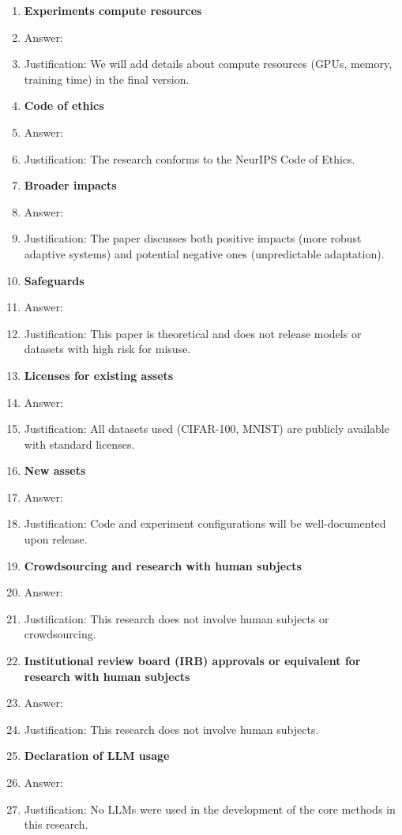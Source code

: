 \documentclass{article}
\begin{document}
\begin{enumerate}
\item {\bf Experiments compute resources}
    \item[] Answer: \answerNo{} 
    \item[] Justification: We will add details about compute resources (GPUs, memory, training time) in the final version.

\item {\bf Code of ethics}
    \item[] Answer: \answerYes{} 
    \item[] Justification: The research conforms to the NeurIPS Code of Ethics.

\item {\bf Broader impacts}
    \item[] Answer: \answerYes{} 
    \item[] Justification: The paper discusses both positive impacts (more robust adaptive systems) and potential negative ones (unpredictable adaptation).

\item {\bf Safeguards}
    \item[] Answer: \answerNA{} 
    \item[] Justification: This paper is theoretical and does not release models or datasets with high risk for misuse.

\item {\bf Licenses for existing assets}
    \item[] Answer: \answerYes{} 
    \item[] Justification: All datasets used (CIFAR-100, MNIST) are publicly available with standard licenses.

\item {\bf New assets}
    \item[] Answer: \answerYes{} 
    \item[] Justification: Code and experiment configurations will be well-documented upon release.

\item {\bf Crowdsourcing and research with human subjects}
    \item[] Answer: \answerNA{} 
    \item[] Justification: This research does not involve human subjects or crowdsourcing.

\item {\bf Institutional review board (IRB) approvals or equivalent for research with human subjects}
    \item[] Answer: \answerNA{} 
    \item[] Justification: This research does not involve human subjects.

\item {\bf Declaration of LLM usage}
    \item[] Answer: \answerNA{} 
    \item[] Justification: No LLMs were used in the development of the core methods in this research.
\end{enumerate}
\end{document}
